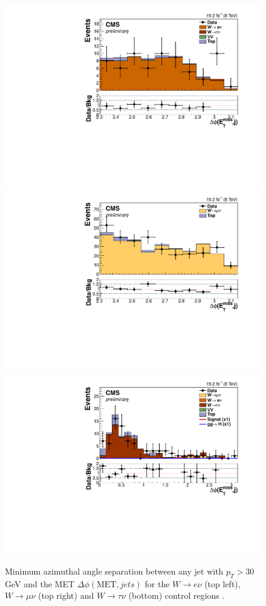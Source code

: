 \begin{figure}[!htb]
\centering
\includegraphics[width=.49\textwidth]{Chapter07/Images/output_sigreg/enu_alljetsmetnomu_mindphi.pdf}
\includegraphics[width=.49\textwidth]{Chapter07/Images/output_sigreg/munu_alljetsmetnomu_mindphi.pdf} \\
\includegraphics[width=.49\textwidth]{Chapter07/Images/output_sigreg/taunu_alljetsmetnomu_mindphi.pdf}
\caption{Minimum azimuthal angle separation between any jet with $p_{T}>30$ GeV and the \gls{MET} $\Delta\phi(\text{MET},jets)$ for the $W\rightarrow e\nu$ (top left), $W\rightarrow\mu\nu$ (top right) and $W\rightarrow\tau\nu$ (bottom) control regions \cite{ARTICLE:CMSVBFHiggsInvisibleParkedAnalysisPAS}.}
\label{fig:wmindphicontplots}
\end{figure}
 

